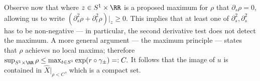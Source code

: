       Observe now that where $z\in S^1\times \RR$ is a proposed maximum for $\rho$ that $\partial_s\rho=0$, allowing us to write $(\partial^2_s \rho + \partial^2_t \rho)|_z \geq 0$. This implies that at least one of $\partial^2_s, \partial^2_s$ has to be non-negative --- in particular, the second derivative test does not detect the maximum. A more general argument --- the maximum principle --- states that $\rho$ achieves no local maxima; therefore $\sup_{S^1\times \RR} \rho \leq \max_{t\in S^1} \exp(r\circ \gamma_\pm)=:C.$ It follows that the image of $u$ is contained in $\hat X|_{\rho< C}$, which is a compact set.
 
